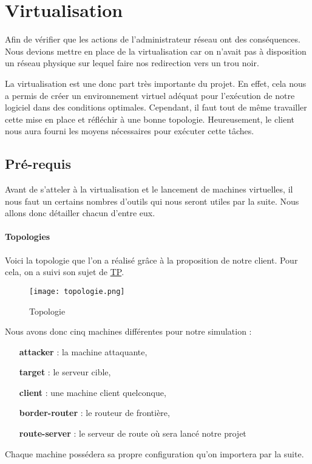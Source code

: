 \chapter{Virtualisation} %

Afin de vérifier que les actions de l'administrateur réseau ont des conséquences. Nous devions mettre en place de la virtualisation car on n'avait pas à disposition un réseau physique sur lequel faire nos redirection vers un trou noir.

La virtualisation est une donc part très importante du projet. En effet, cela nous a permis de créer un environnement virtuel adéquat pour l'exécution de notre logiciel dans des conditions optimales.
Cependant, il faut tout de même travailler cette mise en place et réfléchir à une bonne topologie. Heureusement, le client nous aura fourni les moyens nécessaires pour exécuter cette tâches.

\section{Pré-requis}
Avant de s'atteler à la virtualisation et le lancement de machines virtuelles, il nous faut un certains nombres d'outils qui nous seront utiles par la suite. Nous allons donc détailler chacun d'entre eux.

\subsubsection{Topologies}
Voici la topologie que l'on a réalisé grâce à la proposition de notre client. Pour cela, on a suivi son sujet de \href{http://dept-info.labri.fr/~magoni/rvep/TD-RTBHR/TD-RTBHR.pdf}{TP}.

\begin{figure}
    \texttt{[image: topologie.png]}
    \caption{Topologie}
    \label{fig:topo}
\end{figure}

Nous avons donc cinq machines différentes pour notre simulation :
\begin{itemize}
    \item [\textbf{attacker}] : la machine attaquante,
    \item [\textbf{target}] : le serveur cible,
    \item [\textbf{client}] : une machine client quelconque,
    \item [\textbf{border-router}] : le routeur de frontière,
    \item [\textbf{route-server}] : le serveur de route où sera lancé notre projet
\end{itemize}
Chaque machine possédera sa propre configuration qu'on importera par la suite.
